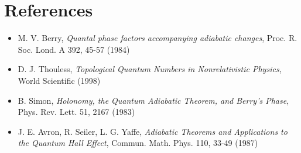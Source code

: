 \documentclass{article}
\begin{document}
\section{References}
\begin{itemize}
\item M. V. Berry, \textit{Quantal phase factors accompanying adiabatic changes}, Proc. R. Soc. Lond. A 392, 45-57 (1984)
\item D. J. Thouless, \textit{Topological Quantum Numbers in Nonrelativistic Physics}, World Scientific (1998)
\item B. Simon, \textit{Holonomy, the Quantum Adiabatic Theorem, and Berry's Phase}, Phys. Rev. Lett. 51, 2167 (1983)
\item J. E. Avron, R. Seiler, L. G. Yaffe, \textit{Adiabatic Theorems and Applications to the Quantum Hall Effect}, Commun. Math. Phys. 110, 33-49 (1987)
\end{itemize}
\end{document}
